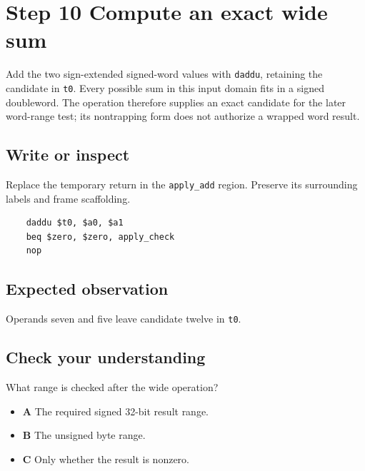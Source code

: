 \section{Step 10 Compute an exact wide sum}\label{expression-s10}

Add the two sign-extended signed-word values with \texttt{daddu}, retaining the candidate in \texttt{t0}. Every possible sum in this input domain fits in a signed doubleword. The operation therefore supplies an exact candidate for the later word-range test; its nontrapping form does not authorize a wrapped word result.

\subsection{Write or inspect}
Replace the temporary return in the \texttt{apply\_add} region. Preserve its surrounding labels and frame scaffolding.

\begin{verbatim}
    daddu $t0, $a0, $a1
    beq $zero, $zero, apply_check
    nop
\end{verbatim}
\subsection{Expected observation}
Operands seven and five leave candidate twelve in \texttt{t0}.

\subsection{Check your understanding}
What range is checked after the wide operation?

\begin{itemize}
  \item \textbf{A} The required signed 32-bit result range.
  \item \textbf{B} The unsigned byte range.
  \item \textbf{C} Only whether the result is nonzero.
\end{itemize}
